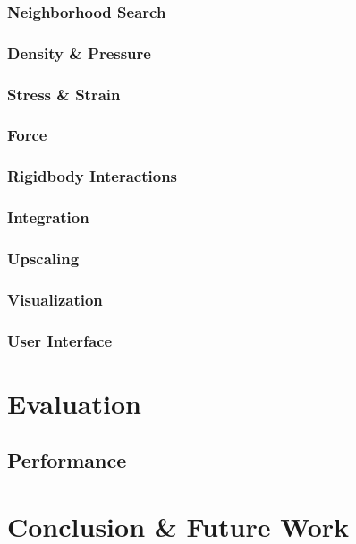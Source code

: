 \documentclass[intern]{cgMA}
\begin{document}
    \subsubsection{Neighborhood Search}
    
    \subsubsection{Density \& Pressure}
    
    \subsubsection{Stress \& Strain}
    
    \subsubsection{Force}
    
    \subsubsection{Rigidbody Interactions}
    
    \subsubsection{Integration}
    
    \subsubsection{Upscaling}
    
    \subsubsection{Visualization}
    
    \subsubsection{User Interface}
    
    \section{Evaluation}
    
    \subsection{Performance}
    
    \section{Conclusion \& Future Work}
    
    \newpage
    \printbibliography
\end{document}
